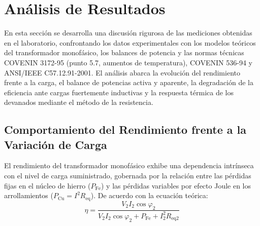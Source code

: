 \section{Análisis de Resultados}

En esta sección se desarrolla una discusión rigurosa de las mediciones obtenidas en el laboratorio, confrontando los datos experimentales con los modelos teóricos del transformador monofásico, los balances de potencia y las normas técnicas COVENIN 3172-95 (punto 5.7, aumentos de temperatura), COVENIN 536-94 y ANSI/IEEE C57.12.91-2001. El análisis abarca la evolución del rendimiento frente a la carga, el balance de potencias activa y aparente, la degradación de la eficiencia ante cargas fuertemente inductivas y la respuesta térmica de los devanados mediante el método de la resistencia.

\subsection{Comportamiento del Rendimiento frente a la Variación de Carga}

El rendimiento del transformador monofásico exhibe una dependencia intrínseca con el nivel de carga suministrado, gobernada por la relación entre las pérdidas fijas en el núcleo de hierro ($P_{\text{Fe}}$) y las pérdidas variables por efecto Joule en los arrollamientos ($P_{\text{Cu}} = I^2 R_{\text{eq}}$). De acuerdo con la ecuación teórica:
\begin{equation}
    \eta = \frac{V_2 I_2 \cos\varphi_2}{V_2 I_2 \cos\varphi_2 + P_{\text{Fe}} + I_2^2 R_{\text{eq2}}}
\end{equation}

